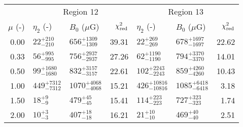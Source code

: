\begin{tabular}{@{}rllrllr@{}}
\cmidrule{1-7}
{} & \multicolumn{3}{c}{Region 12}
   & \multicolumn{3}{c}{Region 13} \\
\cmidrule(lr){2-4} \cmidrule(l){5-7}
$\mu$ (-) & $\eta_2$ (-) & $B_0$ ($\mu$G) & $\chi^2_{\mathrm{red}}$
          & $\eta_2$ (-) & $B_0$ ($\mu$G) & $\chi^2_{\mathrm{red}}$ \\
\cmidrule{1-7}
0.00 & ${22}^{+210}_{-210}$ & ${656}^{+1309}_{-1309}$ & 39.31
     & ${22}^{+269}_{-269}$ & ${678}^{+1697}_{-1697}$ & 22.62 \\
0.33 & ${56}^{+995}_{-995}$ & ${756}^{+2937}_{-2937}$ & 27.26
     & ${62}^{+1190}_{-1190}$ & ${794}^{+3370}_{-3370}$ & 14.01 \\
0.50 & ${99}^{+1680}_{-1680}$ & ${832}^{+3157}_{-3157}$ & 22.61
     & ${102}^{+2243}_{-2243}$ & ${859}^{+4260}_{-4260}$ & 10.43 \\
1.00 & ${449}^{+7312}_{-7312}$ & ${1070}^{+4068}_{-4068}$ & 15.21
     & ${426}^{+10816}_{-10816}$ & ${1085}^{+6418}_{-6418}$ & 3.18 \\
1.50 & ${18}^{+9}_{-9}$ & ${479}^{+45}_{-45}$ & 15.41
     & ${114}^{+223}_{-223}$ & ${727}^{+323}_{-323}$ & 1.74 \\
2.00 & ${10}^{+3}_{-3}$ & ${407}^{+18}_{-18}$ & 16.21
     & ${21}^{+10}_{-10}$ & ${469}^{+40}_{-40}$ & 2.51 \\
\bottomrule
\end{tabular}
